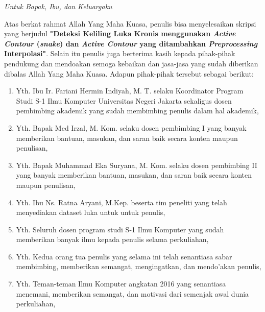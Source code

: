 \documentclass{jtetiskripsi}
\begin{document}
\cover
%
%




\acknowledgment
\begin{flushright}
	\emph{Untuk Bapak, Ibu, dan Keluargaku}
\end{flushright}


\preface
\pagestyle{chapterheading}
Atas berkat rahmat Allah Yang Maha Kuasa, penulis bisa menyelesaikan skripsi yang berjudul \textbf{"Deteksi Keliling Luka Kronis menggunakan \emph{Active Contour} (\emph{snake}) dan \emph{Active Contour} yang ditambahkan \emph{Preprocessing} Interpolasi"}. Selain itu penulis juga berterima kasih kepada pihak-pihak pendukung dan mendoakan semoga kebaikan dan jasa-jasa yang sudah diberikan dibalas Allah Yang Maha Kuasa. Adapun pihak-pihak tersebut sebagai berikut:

\begin{enumerate}
	\item Yth. Ibu Ir. Fariani Hermin Indiyah, M. T. selaku Koordinator Program Studi S-1 Ilmu Komputer Universitas Negeri Jakarta sekaligus dosen pembimbing akademik yang sudah membimbing penulis dalam hal akademik,
	\item Yth. Bapak Med Irzal, M. Kom. selaku dosen pembimbing I yang banyak memberikan bantuan, masukan, dan saran baik secara konten maupun penulisan,
	\item Yth. Bapak Muhammad Eka Suryana, M. Kom. selaku dosen pembimbing II yang banyak memberikan bantuan, masukan, dan saran baik secara konten maupun penulisan,
	\item Yth. Ibu Ns. Ratna Aryani, M.Kep. beserta tim peneliti yang telah menyediakan dataset luka untuk untuk penulis,
	\item Yth. Seluruh dosen program studi S-1 Ilmu Komputer yang sudah memberikan banyak ilmu kepada penulis selama perkuliahan,
	\item Yth. Kedua orang tua penulis yang selama ini telah senantiasa sabar membimbing, memberikan semangat, mengingatkan, dan mendo’akan penulis,
	\item Yth. Teman-teman Ilmu Komputer angkatan 2016 yang senantiasa menemani, memberikan semangat, dan motivasi dari semenjak awal dunia perkuliahan,
\end{enumerate}
\end{document}
